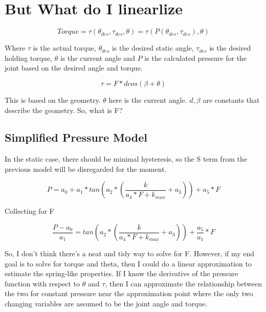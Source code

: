\documentclass[12pt, letterpaper, oneside, notitlepage, onecolumn]{article}
\begin{document}
\section{But What do I linearlize}

\begin{equation}
Torque = \tau(\theta_{des}, \tau_{des}, \theta) = \tau(P(\theta_{des},
\tau_{des}), \theta)
\end{equation}

Where $\tau$ is the actual torque, $\theta_{des}$ is the desired static angle, 
$\tau_{des}$ is the desired holding torque, $\theta$ is the current angle and
$P$ is the calculated pressure for the joint based on the desired angle and
torque.

\begin{equation}
\tau = F * d cos(\beta + \theta)
\end{equation}

This is based on the geometry. $\theta$ here is the current angle. $d, \beta$
are constants that describe the geometry. So, what is F?

\subsection{Simplified Pressure Model}

In the static case, there should be minimal hysteresis, so the S term from the
previous model will be disregarded for the moment.

\begin{equation}
P = a_{0} + a_{1} * tan(a_{2} * (\dfrac{k}{a_{4} * F + k_{max}} + a_{3})) + a_{5} * F
\end{equation}

Collecting for F

\begin{equation}
\dfrac{P - a_{0}}{a_{1}} = tan(a_{2} * (\dfrac{k}{a_{4} * F + k_{max}} + a_{3})) +
\dfrac{a_{5}}{a_{1}} * F
\end{equation}

So, I don't think there's a neat and tidy way to solve for F. However, if my end
goal is to solve for torque and theta, then I could do a linear approximation to
estimate the spring-like properties. If I know the derivative of the pressure
function with respect to $\theta$ and $\tau$, then I can approximate the
relationship between the two for constant pressure near the approximation point
where the only two changing variables are assumed to be the joint angle and
torque.
\end{document}
